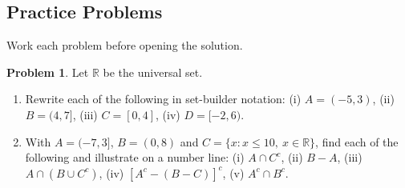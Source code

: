 \documentclass[11pt,a4paper]{article}
\theoremstyle{definition}
\newtheorem{problemx}{Problem}[section]
\newenvironment{problem}{\begin{problemx}}{\end{problemx}}
\begin{document}
\subsection{Practice Problems}

Work each problem before opening the solution.

\begin{problem}
Let $\mathbb{R}$ be the universal set.
\begin{enumerate}
\item[(a).] Rewrite each of the following in set-builder notation:
\quad (i) $A=(-5,3)$, \quad (ii) $B=(4,7]$, \quad (iii) $C=[0,4]$, \quad
(iv) $D=[-2,6)$.
\item[(b).] With $A=(-7,3]$, $B=(0,8)$ and $C=\{x: x\leq 10,\ x\in\mathbb{R}\}$, find
each of the following and illustrate on a number line:
\quad (i) $A\cap C^c$, \quad (ii) $B-A$, \quad (iii) $A\cap\left(B\cup C^c\right)$,
\quad (iv) $\left[A^c-(B-C)\right]^c$, \quad (v) $A^c\cap B^c$.
\end{enumerate}
\end{problem}
\end{document}
